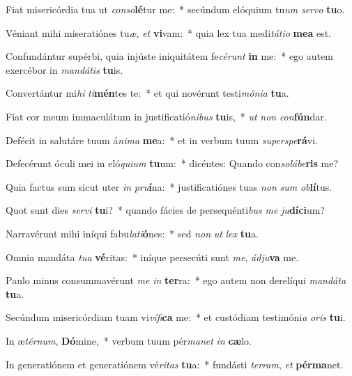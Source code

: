 \item Fiat misericórdia tua ut \textit{con}\textit{so}\textbf{lé}tur me:~* secúndum elóquium tu\textit{um} \textit{ser}\textit{vo} \textbf{tu}o.
\item Véniant mihi miseratiónes tu\textit{æ}, \textit{et} \textbf{vi}vam:~* quia lex tua medi\textit{tá}\textit{ti}\textit{o} \textbf{me}\textbf{a} est.
\item Confundántur supérbi, quia injúste iniquitátem fe\textit{cé}\textit{runt} \textbf{in} me:~* ego autem exercébor in \textit{man}\textit{dá}\textit{tis} \textbf{tu}is.
\item Convertántur mi\textit{hi} \textit{ti}\textbf{mén}tes te:~* et qui novérunt testi\textit{mó}\textit{ni}\textit{a} \textbf{tu}a.
\item Fiat cor meum immaculátum in justificatió\textit{ni}\textit{bus} \textbf{tu}is,~* \textit{ut} \textit{non} \textit{con}\textbf{fún}dar.
\item Defécit in salutáre tuum á\textit{ni}\textit{ma} \textbf{me}a:~* et in verbum tuum \textit{su}\textit{per}\textit{spe}\textbf{rá}vi.
\item Defecérunt óculi mei in eló\textit{qui}\textit{um} \textbf{tu}um:~* dicéntes: Quando con\textit{so}\textit{lá}\textit{be}\textbf{ris} me?
\item Quia factus sum sicut uter \textit{in} \textit{pru}\textbf{í}na:~* justificatiónes tuas \textit{non} \textit{sum} \textit{ob}\textbf{lí}tus.
\item Quot sunt dies \textit{ser}\textit{vi} \textbf{tu}i?~* quando fácies de persequénti\textit{bus} \textit{me} \textit{ju}\textbf{dí}\textbf{ci}um?
\item Narravérunt mihi iníqui fabu\textit{la}\textit{ti}\textbf{ó}nes:~* sed \textit{non} \textit{ut} \textit{lex} \textbf{tu}a.
\item Omnia mandáta \textit{tu}\textit{a} \textbf{vé}ritas:~* iníque persecúti sunt \textit{me}, \textit{ád}\textit{ju}\textbf{va} me.
\item Paulo minus consummavérunt \textit{me} \textit{in} \textbf{ter}ra:~* ego autem non derelíqui \textit{man}\textit{dá}\textit{ta} \textbf{tu}a.
\item Secúndum misericórdiam tuam vi\textit{ví}\textit{fi}\textbf{ca} me:~* et custódiam testimóni\textit{a} \textit{o}\textit{ris} \textbf{tu}i.
\item In æ\textit{tér}\textit{num}, \textbf{Dó}mine,~* verbum tuum pér\textit{ma}\textit{net} \textit{in} \textbf{cæ}lo.
\item In generatiónem et generatiónem vé\textit{ri}\textit{tas} \textbf{tu}a:~* fundásti \textit{ter}\textit{ram}, \textit{et} \textbf{pér}\textbf{ma}net.
